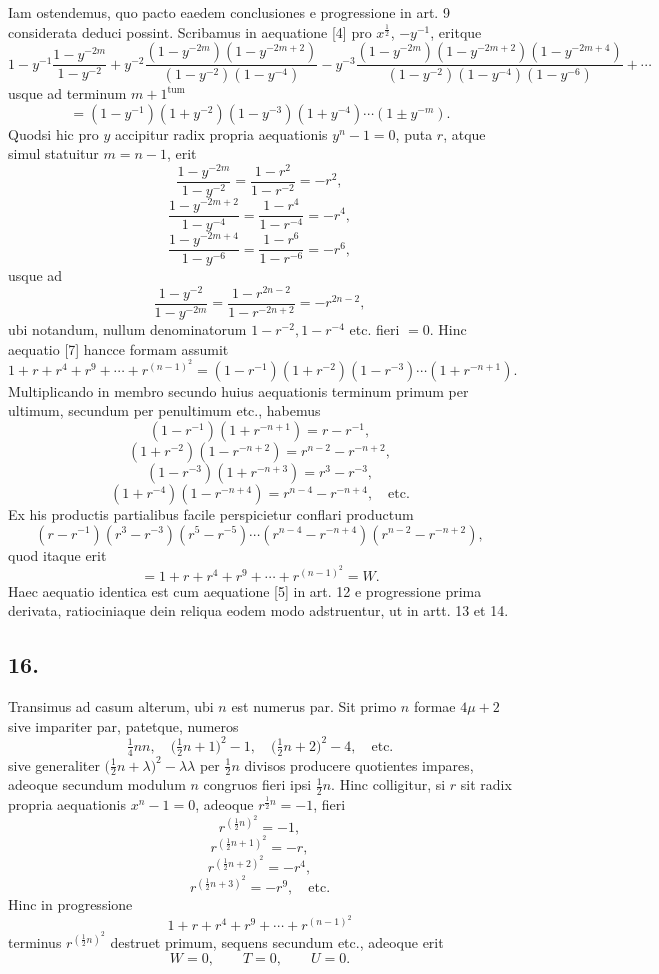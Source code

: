 \documentclass[12pt]{article}
\begin{document}
Iam ostendemus, quo pacto eaedem conclusiones e progressione in art. 9 considerata deduci possint. Scribamus in aequatione [4] pro $x^{\frac12}$, $-y^{-1}$, eritque
\[
1-y^{-1}\frac{1-y^{-2m}}{1-y^{-2}}
+y^{-2}\frac{(1-y^{-2m})(1-y^{-2m+2})}{(1-y^{-2})(1-y^{-4})}
-y^{-3}\frac{(1-y^{-2m})(1-y^{-2m+2})(1-y^{-2m+4})}{(1-y^{-2})(1-y^{-4})(1-y^{-6})}
+\cdots
\]
usque ad terminum $m+1^{\mathrm{tum}}$
\[
=(1-y^{-1})(1+y^{-2})(1-y^{-3})(1+y^{-4})\cdots(1\pm y^{-m}). \tag{7}
\]
Quodsi hic pro $y$ accipitur radix propria aequationis $y^n-1=0$, puta $r$, atque simul statuitur $m=n-1$, erit
\[
\frac{1-y^{-2m}}{1-y^{-2}}=\frac{1-r^2}{1-r^{-2}}=-r^2,
\]
\[
\frac{1-y^{-2m+2}}{1-y^{-4}}=\frac{1-r^4}{1-r^{-4}}=-r^4,
\]
\[
\frac{1-y^{-2m+4}}{1-y^{-6}}=\frac{1-r^6}{1-r^{-6}}=-r^6,
\]
usque ad
\[
\frac{1-y^{-2}}{1-y^{-2m}}=\frac{1-r^{2n-2}}{1-r^{-2n+2}}=-r^{2n-2},
\]
ubi notandum, nullum denominatorum $1-r^{-2},1-r^{-4}$ etc. fieri $=0$. Hinc aequatio [7] hancce formam assumit
\[
1+r+r^4+r^9+\cdots+r^{(n-1)^2}
=(1-r^{-1})(1+r^{-2})(1-r^{-3})\cdots(1+r^{-n+1}).
\]
Multiplicando in membro secundo huius aequationis terminum primum per ultimum, secundum per penultimum etc., habemus
\[
(1-r^{-1})(1+r^{-n+1})=r-r^{-1},
\]
\[
(1+r^{-2})(1-r^{-n+2})=r^{n-2}-r^{-n+2},
\]
\[
(1-r^{-3})(1+r^{-n+3})=r^3-r^{-3},
\]
\[
(1+r^{-4})(1-r^{-n+4})=r^{n-4}-r^{-n+4},\quad\text{etc.}
\]
Ex his productis partialibus facile perspicietur conflari productum
\[
(r-r^{-1})(r^3-r^{-3})(r^5-r^{-5})\cdots(r^{n-4}-r^{-n+4})(r^{n-2}-r^{-n+2}),
\]
quod itaque erit
\[
=1+r+r^4+r^9+\cdots+r^{(n-1)^2}=W.
\]
Haec aequatio identica est cum aequatione [5] in art. 12 e progressione prima derivata, ratiociniaque dein reliqua eodem modo adstruentur, ut in artt. 13 et 14.

\subsection*{16.}

Transimus ad casum alterum, ubi $n$ est numerus par. Sit primo $n$ formae $4\mu+2$ sive impariter par, patetque, numeros
\[
\tfrac14 nn,\quad \bigl(\tfrac12 n+1\bigr)^2-1,\quad \bigl(\tfrac12 n+2\bigr)^2-4,\quad\text{etc.}
\]
sive generaliter $\bigl(\tfrac12 n+\lambda\bigr)^2-\lambda\lambda$ per $\tfrac12 n$ divisos producere quotientes impares, adeoque secundum modulum $n$ congruos fieri ipsi $\tfrac12 n$. Hinc colligitur, si $r$ sit radix propria aequationis $x^n-1=0$, adeoque $r^{\frac12 n}=-1$, fieri
\[
r^{(\frac12 n)^2}=-1,
\]
\[
r^{(\frac12 n+1)^2}=-r,
\]
\[
r^{(\frac12 n+2)^2}=-r^4,
\]
\[
r^{(\frac12 n+3)^2}=-r^9,\quad\text{etc.}
\]
Hinc in progressione
\[
1+r+r^4+r^9+\cdots+r^{(n-1)^2}
\]
terminus $r^{(\frac12 n)^2}$ destruet primum, sequens secundum etc., adeoque erit
\[
W=0,\qquad T=0,\qquad U=0.
\]
\end{document}
